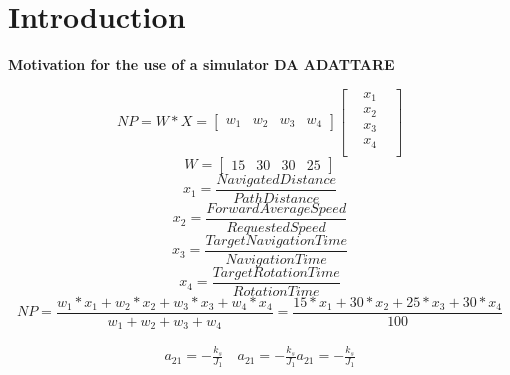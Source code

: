 \section{Introduction}
\textbf{Motivation for the use of a simulator DA ADATTARE}



\begin{equation}
        NP = W * X =
    \begin{bmatrix}
            w_{1} & w_{2} & w_{3} & w_{4}
    \end{bmatrix}
    \begin{bmatrix}
        & x_{1} &\\
        & x_{2} &\\
        & x_{3} &\\
        & x_{4} &\\
    \end{bmatrix}
\end{equation}
\begin{equation}
    W =
    \begin{bmatrix}
        15 & 30 & 30 & 25
    \end{bmatrix}
\end{equation}
\begin{equation}
    x_{1} = \frac{Navigated Distance}{Path Distance}
\end{equation}
\begin{equation}
    x_{2} = \frac{Forward Average Speed}{Requested Speed}
\end{equation}
\begin{equation}
    x_{3} = \frac{Target Navigation Time}{ Navigation Time}
\end{equation}
\begin{equation}
    x_{4} = \frac{Target Rotation Time}{Rotation Time}
\end{equation}
\begin{equation}
    NP = \frac{w_{1}*x_{1}+w_{2}*x_{2}+w_{3}*x_{3}+w_{4}*x_{4} }{w_{1} + w_{2} + w_{3} + w_{4}} 
    = \frac{15*x_{1}+30*x_{2}+25*x_{3}+30*x_{4}}{100}
\end{equation}

    \begin{gather}
        a_{21} = -\frac{k_{s}}{J_{1}} 
        \quad 
        a_{21} = -\frac{k_{s}}{J_{1}}
        a_{21} = -\frac{k_{s}}{J_{1}}
    \end{gather}
